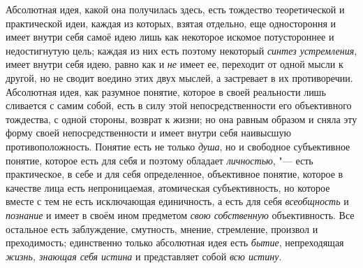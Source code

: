 {{Абсолютная идея, какой она получилась здесь, есть тождество
теоретической и практической идеи, каждая из которых, взятая отдельно, еще
одностороння и имеет внутри себя самоё идею лишь как некоторое искомое
потустороннее и недостигнутую цель; каждая из них есть поэтому некоторый
{\em синтез устремления},
имеет внутри себя идею, равно как и
{\em не} имеет ее,
переходит от одной мысли к другой, но не сводит воедино этих двух мыслей, а
застревает в их противоречии. Абсолютная идея, как разумное понятие,
которое в своей реальности лишь сливается с самим собой, есть в силу этой
непосредственности его объективного тождества, с одной стороны, возврат к
жизни; но она равным образом и сняла эту форму своей непосредственности и
имеет внутри себя наивысшую противоположность. Понятие есть не только
{\em душа}, но и
свободное субъективное понятие, которое есть для себя и поэтому обладает
{\em личностью}, "--- есть
практическое, в себе и для себя определенное, объективное понятие, которое
в качестве лица есть непроницаемая, атомическая субъективность, но которое
вместе с тем не есть исключающая единичность, а есть для себя
{\em всеобщность} и
{\em познание} и имеет в
своём ином предметом {\em свою
собственную} объективность. Все остальное есть заблуждение,
смутность, мнение, стремление, произвол и преходимость; единственно только
абсолютная идея есть {\em бытие},
непреходящая {\em жизнь,
знающая себя истина} и представляет собой
{\em всю истину}.

}}
